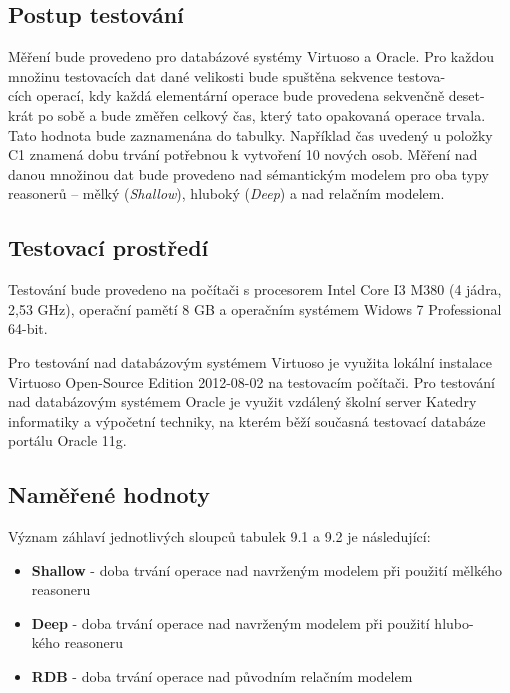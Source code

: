 \documentclass{projekt}
\begin{document}
\subsection{Postup testování}
\hspace{0.65cm}Měření bude provedeno pro databázové systémy Virtuoso a Oracle. Pro každou množinu testovacích dat dané velikosti bude spuštěna sekvence testova-\\cích operací, kdy každá elementární operace bude provedena sekvenčně deset-\\krát po sobě a bude změřen celkový čas, který tato opakovaná operace trvala. Tato hodnota bude zaznamenána do tabulky. Například čas uvedený u položky C1 znamená dobu trvání potřebnou k vytvoření 10 nových osob.
Měření nad danou množinou dat bude provedeno nad sémantickým modelem pro oba typy reasonerů – mělký ({\it Shallow}), hluboký ({\it Deep}) a nad relačním modelem.

\subsection{Testovací prostředí}
\hspace{0.65cm}Testování bude provedeno na počítači s procesorem Intel Core I3 M380 (4 jádra, 2,53 GHz), operační pamětí 8 GB a operačním systémem Widows 7 Professional 64-bit.

Pro testování nad databázovým systémem Virtuoso je využita lokální instalace Virtuoso Open-Source Edition 2012-08-02 na testovacím počítači. Pro testování nad databázovým systémem Oracle je využit vzdálený školní server Katedry informatiky a výpočetní techniky, na kterém běží současná testovací databáze portálu Oracle 11g.

\subsection{Naměřené hodnoty}

Význam záhlaví jednotlivých sloupců tabulek 9.1 a 9.2 je následující:

\begin{itemize}
\item {\bf Shallow} - doba trvání operace nad navrženým modelem při použití mělkého reasoneru
\item {\bf Deep} - doba trvání operace nad navrženým modelem při použití hlubo-\\kého reasoneru
\item {\bf RDB} - doba trvání operace nad původním relačním modelem
\end{itemize}
\end{document}
